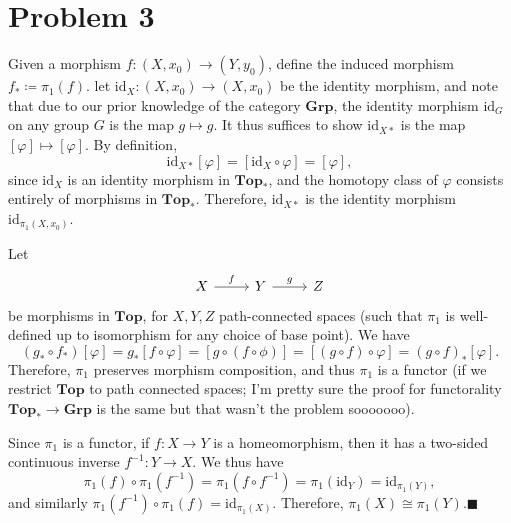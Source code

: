 \documentclass[11pt, letterpaper]{article}
\begin{document}
\section*{Problem 3}
Given a morphism $f:(X,x_0)\to (Y,y_0)$, define the induced morphism $f_*\coloneqq \pi _1(f)$. let $\mathrm{id} _X : (X,x_0) \to (X,x_0)$ be the identity morphism, and note that due to our prior knowledge of the category $\mathbf{Grp} $, the identity morphism $\mathrm{id} _G$ on any group $G$ is the map $g\mapsto g$. It thus suffices to show $\mathrm{id}_{X*} $ is the map $\left[ \varphi  \right] \mapsto \left[ \varphi \right] $. By definition,
\[
	\mathrm{id}_{X*} [\varphi ]=\left[ \mathrm{id}_X \circ \varphi  \right] =\left[ \varphi  \right] ,
\]
since $\mathrm{id}_X$ is an identity morphism in $\mathbf{Top} _*$, and the homotopy class of $\varphi $ consists entirely of morphisms in $\mathbf{Top} _*$. Therefore, $\mathrm{id}_{X*} $ is the identity morphism $\mathrm{id}_{\pi _1(X,x_0)} $.

Let
\[\begin{tikzcd}[row sep = 2.5em, column sep = 2.5em]
X\ar[" f ", r]  & Y\ar[" g ", r]  & Z
\end{tikzcd}\]
be morphisms in $\mathbf{Top}$, for $X,Y,Z$ path-connected spaces (such that $\pi _1$ is well-defined up to isomorphism for any choice of base point). We have
\[
	(g_*\circ f_*)[\varphi ]=g_*[f\circ \varphi ]=[g\circ (f\circ \phi) ]=[(g\circ f)\circ \varphi ]=(g\circ f)_*[\varphi ]
.\]
Therefore, $\pi _1$ preserves morphism composition, and thus $\pi _1$ is a functor (if we restrict $\mathbf{Top} $ to path connected spaces; I'm pretty sure the proof for functorality $\mathbf{Top} _*\to \mathbf{Grp} $ is the same but that wasn't the problem sooooooo).

Since $\pi _1$ is a functor, if $f : X \to Y$ is a homeomorphism, then it has a two-sided continuous inverse $f^{-1} : Y \to X$. We thus have
\[
	\pi_1(f)\circ \pi _1(f^{-1} )=\pi _1(f\circ f^{-1} )=\pi _1(\mathrm{id}_Y)=\mathrm{id}_{\pi _1(Y)} 
,\]
and similarly $\pi _1(f^{-1} )\circ \pi _1(f)=\mathrm{id}_{\pi _1(X)} $. Therefore, $\pi _1(X)\cong \pi _1(Y)$.\hfill$\blacksquare$
\end{document}
